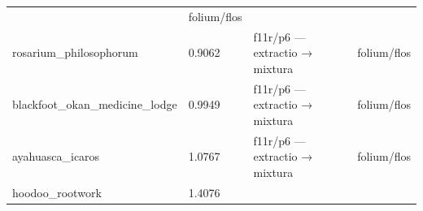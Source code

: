 \begin{longtable}[]{@{}llll@{}}
\begin{minipage}[t]{0.22\columnwidth}
\end{minipage} & \begin{minipage}[t]{0.22\columnwidth}\raggedright
folium/flos\strut
\end{minipage}\tabularnewline
\begin{minipage}[t]{0.22\columnwidth}\raggedright
rosarium\_philosophorum\strut
\end{minipage} & \begin{minipage}[t]{0.22\columnwidth}\raggedright
0.9062\strut
\end{minipage} & \begin{minipage}[t]{0.22\columnwidth}\raggedright
f11r/p6 --- extractio → mixtura\strut
\end{minipage} & \begin{minipage}[t]{0.22\columnwidth}\raggedright
folium/flos\strut
\end{minipage}\tabularnewline
\begin{minipage}[t]{0.22\columnwidth}\raggedright
blackfoot\_okan\_medicine\_lodge\strut
\end{minipage} & \begin{minipage}[t]{0.22\columnwidth}\raggedright
0.9949\strut
\end{minipage} & \begin{minipage}[t]{0.22\columnwidth}\raggedright
f11r/p6 --- extractio → mixtura\strut
\end{minipage} & \begin{minipage}[t]{0.22\columnwidth}\raggedright
folium/flos\strut
\end{minipage}\tabularnewline
\begin{minipage}[t]{0.22\columnwidth}\raggedright
ayahuasca\_icaros\strut
\end{minipage} & \begin{minipage}[t]{0.22\columnwidth}\raggedright
1.0767\strut
\end{minipage} & \begin{minipage}[t]{0.22\columnwidth}\raggedright
f11r/p6 --- extractio → mixtura\strut
\end{minipage} & \begin{minipage}[t]{0.22\columnwidth}\raggedright
folium/flos\strut
\end{minipage}\tabularnewline
\begin{minipage}[t]{0.22\columnwidth}\raggedright
hoodoo\_rootwork\strut
\end{minipage} & \begin{minipage}[t]{0.22\columnwidth}\raggedright
1.4076\strut

\end{minipage}
\end{longtable}
